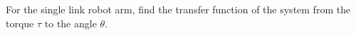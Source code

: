 For the single link robot arm, find the transfer function of the system from the torque $\tau$ to the angle $\theta$.
